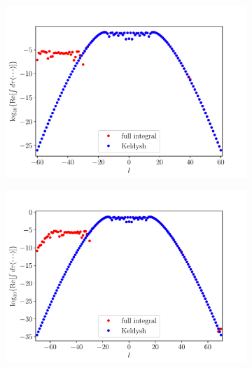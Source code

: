 \begin{figure}
\begin{subfigure}[b]{0.33\linewidth}
  \end{subfigure}
  \begin{subfigure}[b]{0.33\linewidth}
    \includegraphics[width=\textwidth]{figures/ch_ATI_SFA/1b2/l60n512WP40PG25MR35vsKeldysh.pdf}
  \end{subfigure}
  \begin{subfigure}[b]{0.33\linewidth}
    \includegraphics[width=\textwidth]{figures/ch_ATI_SFA/1b2/l70n512WP40PG25MR35vsKeldysh.pdf}
  \end{subfigure}
  \begin{subfigure}[b]{0.33\linewidth}

\end{subfigure}
\end{figure}
